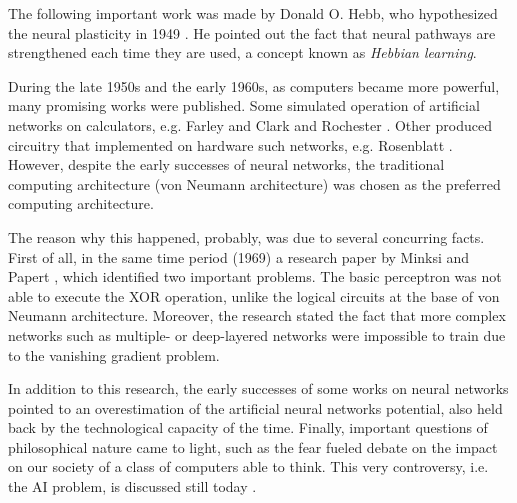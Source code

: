 The following important work was made by Donald O. Hebb, who hypothesized the neural plasticity in 1949 \cite{hebb1949organization}.
He pointed out the fact that neural pathways are strengthened each time they are used, a concept known as \textit{Hebbian learning}.

During the late 1950s and the early 1960s, as computers became more powerful, many promising works were published.
Some simulated operation of artificial networks on calculators, e.g. Farley and Clark \cite{Farley1954} and Rochester \cite{Rochester1956}.
Other produced circuitry that implemented on hardware such networks, e.g. Rosenblatt \cite{frank1957perceptron,Rosenblatt1958}.
However, despite the early successes of neural networks, the traditional computing architecture (von Neumann architecture) was chosen as the preferred computing architecture.

The reason why this happened, probably, was due to several concurring facts.
First of all, in the same time period (1969) a research paper by Minksi and Papert \cite{minski1969perceptrons}, which identified two important problems.
The basic perceptron was not able to execute the \ac{XOR} operation, unlike the logical circuits at the base of von Neumann architecture.
Moreover, the research stated the fact that more complex networks such as multiple- or deep-layered networks were impossible to train due to the vanishing gradient problem. %


In addition to this research, the early successes of some works on neural networks pointed to an overestimation of the artificial neural networks potential, also held back by the technological capacity of the time.
Finally, important questions of philosophical nature came to light, such as the fear fueled debate on the impact on our society of a class of computers able to think.
This very controversy, i.e. the \ac{AI} problem, is discussed still today \cite{stanford.edu}.

